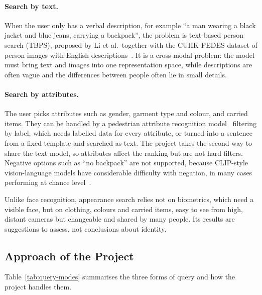 \paragraph{Search by text.} When the user only has a verbal description, for example ``a man wearing a black jacket and blue jeans, carrying a backpack'', the problem is text-based person search (TBPS), proposed by Li et al.\ together with the CUHK-PEDES dataset of person images with English descriptions~\cite{li2017cuhkpedes}. It is a cross-modal problem: the model must bring text and images into one representation space, while descriptions are often vague and the differences between people often lie in small details.

\paragraph{Search by attributes.} The user picks attributes such as gender, garment type and colour, and carried items. They can be handled by a pedestrian attribute recognition model~\cite{wang2022parsurvey} filtering by label, which needs labelled data for every attribute, or turned into a sentence from a fixed template and searched as text. The project takes the second way to share the text model, so attributes affect the ranking but are not hard filters. Negative options such as ``no backpack'' are not supported, because CLIP-style vision-language models have considerable difficulty with negation, in many cases performing at chance level~\cite{alhamoud2025negation}.

Unlike face recognition, appearance search relies not on biometrics, which need a visible face, but on clothing, colours and carried items, easy to see from high, distant cameras but changeable and shared by many people. Its results are suggestions to assess, not conclusions about identity.

\subsection{Approach of the Project}
\label{sec:3.1.6}

Table~\ref{tab:query-modes} summarises the three forms of query and how the project handles them.

